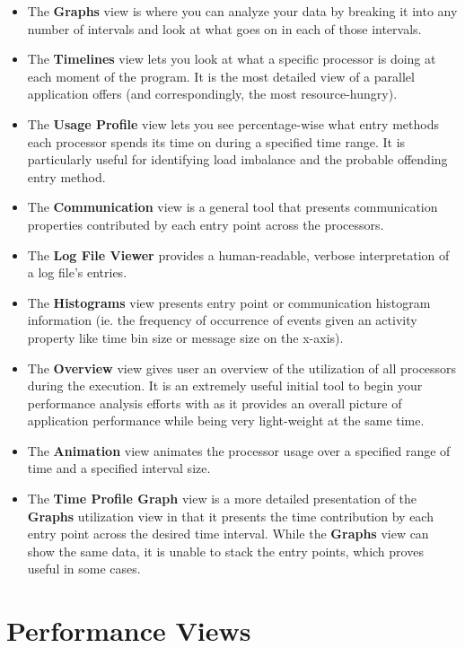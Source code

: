 \documentclass[10pt]{report}
\begin{document}
\begin{itemize}
\item 
The {\bf Graphs} view is where you can analyze your data by breaking it
into any number of intervals and look at what goes on in each of those
intervals.
\item
The {\bf Timelines} view lets you look at what a specific processor is
doing at each moment of the program. It is the most detailed view of a
parallel application \projections{} offers (and correspondingly, the
most resource-hungry).
\item
The {\bf Usage Profile} view lets you see percentage-wise what entry
methods each processor spends its time on during a specified time range.
It is particularly useful for identifying load imbalance and the probable
offending entry method.
\item
The {\bf Communication} view is a general tool that presents
communication properties contributed by each entry point across the
processors.
\item
The {\bf Log File Viewer} provides a human-readable, verbose
interpretation of a log file's entries.
\item
The {\bf Histograms} view presents entry point or communication
histogram information (ie. the frequency of occurrence of events given
an activity property like time bin size or message size on the
x-axis).
\item
The {\bf Overview} view gives user an overview of the utilization of
all processors during the execution. It is an extremely useful initial
tool to begin your performance analysis efforts with as it provides an
overall picture of application performance while being very
light-weight at the same time.
\item
The {\bf Animation} view animates the processor usage over a specified
range of time and a specified interval size.
\item
The {\bf Time Profile Graph} view is a more detailed presentation of
the {\bf Graphs} utilization view in that it presents the time
contribution by each entry point across the desired time
interval. While the {\bf Graphs} view can show the same data, it is
unable to stack the entry points, which proves useful in some cases.
\end{itemize}

\section{Performance Views}
\end{document}
